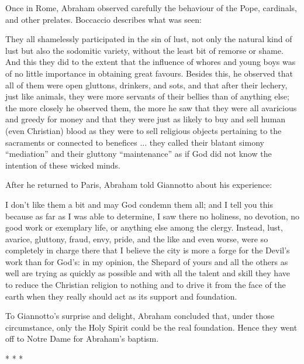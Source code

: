Once in Rome, Abraham observed carefully the behaviour of the Pope, cardinals, and other prelates. Boccaccio describes what was seen:

\begin{quotex}
They all shamelessly participated in the sin of lust, not only the natural kind of lust but also the sodomitic variety, without the least bit of remorse or shame. And this they did to the extent that the influence of whores and young boys was of no little importance in obtaining great favours. Besides this, he observed that all of them were open gluttons, drinkers, and sots, and that after their lechery, just like animals, they were more servants of their bellies than of anything else; the more closely he observed them, the more he saw that they were all avaricious and greedy for money and that they were just as likely to buy and sell human (even Christian) blood as they were to sell religious objects pertaining to the sacraments or connected to benefices ... they called their blatant simony ``mediation'' and their gluttony ``maintenance'' as if God did not know the intention of these wicked minds.
\end{quotex}


After he returned to Paris, Abraham told Giannotto about his experience:

\begin{quotex}
I don't like them a bit and may God condemn them all; and I tell you this because as far as I was able to determine, I saw there no holiness, no devotion, no good work or exemplary life, or anything else among the clergy. Instead, lust, avarice, gluttony, fraud, envy, pride, and the like and even worse, were so completely in charge there that I believe the city is more a forge for the Devil's work than for God's: in my opinion, the Shepard of yours and all the others as well are trying as quickly as possible and with all the talent and skill they have to reduce the Christian religion to nothing and to drive it from the face of the earth when they really should act as its support and foundation.
\end{quotex}


To Giannotto's surprise and delight, Abraham concluded that, under those circumstance, only the Holy Spirit could be the real foundation. Hence they went off to Notre Dame for Abraham's baptism.



\begin{center}* * *\end{center}

